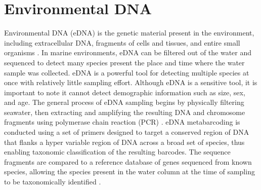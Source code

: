\documentclass[12pt,twoside]{reedthesis}
\begin{document}
\clearpage 

\section{Environmental DNA}\label{IntroeDNA}

Environmental DNA (eDNA) is the genetic material present in the environment, including extracellular DNA, fragments of cells and tissues, and entire small organisms \autocite{Taberlet2018}. In marine environments, eDNA can be filtered out of the water and sequenced to detect many species present the place and time where the water sample was collected. eDNA is a powerful tool for detecting multiple species at once with relatively little sampling effort. Although eDNA is a sensitive tool, it is important to note it cannot detect demographic information such as size, sex, and age. The general process of eDNA sampling begins by physically filtering seawater, then extracting and amplifying the resulting DNA and chromosome fragments using polymerase chain reaction (PCR) \autocite{Power2023}. eDNA metabarcoding is conducted using a set of  primers designed to target a conserved region of DNA that flanks a hyper variable region of DNA across a broad set of species, thus enabling taxonomic classification of the resulting barcodes. The sequence fragments are compared to a reference database of genes sequenced from known species, allowing the species present in the water column at the time of sampling to be taxonomically identified \autocite{Miya2022}.
\end{document}
